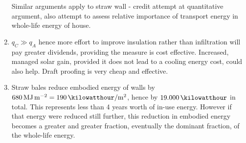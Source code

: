 \documentclass[a4paper,12pt,fleqn]{article}
\begin{document}
\begin{enumerate}[label=\alph*)]
Similar arguments apply to straw wall - credit attempt at quantitative argument, also attempt to assess relative importance of transport energy in whole-life energy of house.
\item $q_C \gg q_A$ hence more effort to improve insulation rather than infiltration will pay greater dividends, providing the measure is cost effective. Increased, managed solar gain, provided it does not lead to a cooling energy cost, could also help. Draft proofing is very cheap and effective.
\item Straw bales reduce embodied energy of walls by $\SI{680}{\mega\joule\per\metre\squared}=\SI{190}{\kilowatthour\per\metre\squared}$, hence by $\SI{19,000}{\kilowatthour}$ in total. This represents less than 4 years worth of in-use energy. However if that energy were reduced still further, this reduction in embodied energy becomes a greater and greater fraction, eventually the dominant fraction, of the whole-life energy.
\end{enumerate}
\end{document}
